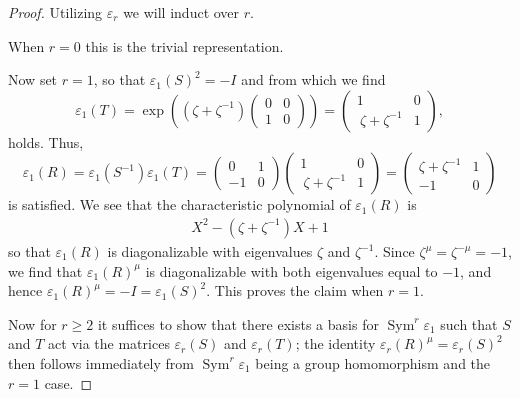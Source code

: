 \documentclass[10pt,a4paper]{amsart}
\DeclareMathOperator{\Sym}{Sym}
\begin{document}
\begin{proof}
    Utilizing $ \varepsilon_r$ we will induct over $r$.  
    
    When $r=0$ this is the trivial representation. 
    
    Now set $r=1$, so that $\varepsilon_1(S)^2 = -I$ and from which we find
    \[
    \varepsilon_1(T) = \exp\!\left((\zeta+\zeta^{-1})\left(\begin{smallmatrix}
        0&0\\
        1&0
    \end{smallmatrix}\right)\right) = \left(\begin{matrix}
        1&0\\\
        \zeta+\zeta^{-1}&1
    \end{matrix}\right),
    \]
    holds. Thus,
    \[
    \varepsilon_1(R) = \varepsilon_1(S^{-1})\varepsilon_1(T) = \left(\begin{matrix}
        0&1\\
        -1&0
    \end{matrix}\right)\left(\begin{matrix}
        1&0\\\
        \zeta+\zeta^{-1}&1
    \end{matrix}\right) = \left(\begin{matrix}
        \zeta+\zeta^{-1}&1\\
        -1&0
    \end{matrix}\right)
    \]
    is satisfied. We see that the characteristic polynomial of $\varepsilon_1(R)$ is 
        \begin{eqnarray*}
            X^2-(\zeta+\zeta^{-1})X+1
        \end{eqnarray*}
    so that $\varepsilon_1(R)$ is diagonalizable with eigenvalues $\zeta$ and $\zeta^{-1}$. Since $ \zeta^\mu =\zeta^{-\mu}=-1$, we find that $\varepsilon_1(R)^\mu$ is diagonalizable with both eigenvalues equal to $-1$, and hence $\varepsilon_1(R)^\mu = -I = \varepsilon_1(S)^2$. This proves the claim when $r=1$.

    Now for $r\geq 2$ it suffices to show that there exists a basis for $\Sym^r\varepsilon_1$ such that $ S$ and $ T $ act via the matrices $\varepsilon_r(S)$ and $\varepsilon_r(T)$; the identity $\varepsilon_r(R)^\mu = \varepsilon_r(S)^2$ then follows immediately from $\Sym^r\varepsilon_1 $ being a group homomorphism and the $r=1$ case. 
    

\end{proof}
\end{document}
